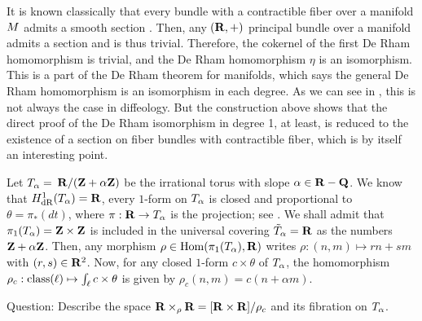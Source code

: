\begin{article}
  \label{The-first-De-Rham-homomorphism-for-manifolds}
  It is known classically that every bundle with a contractible fiber over a manifold $M$ admits a smooth section \cite{Die70c}.
  Then, any $({\mathbf R},+)$ principal bundle over a manifold admits a section and is thus trivial.
  Therefore,
  the cokernel of the first De Rham homomorphism is trivial,
  and the De Rham homomorphism $\eta$ is an isomorphism.
  This is a part of the De Rham theorem for manifolds,
  which says the general De Rham homomorphism is an isomorphism in each degree.
  As we can see in ,
  this is not always the case in diffeology.
  But the construction above  shows that the direct proof of the De Rham isomorphism in degree 1,
  at least,
  is reduced to the existence of a section on fiber bundles with contractible fiber,
  which is by itself an interesting point.
\end{article} %

%
%

\Exercises

\begin{exercise}
  \label{De-Rham-homomorphism-and-irrational-tori}
  Let ${T}_{\alpha} =$
  \linebreak
  ${\mathbf R}/({\mathbf Z}+\alpha{\mathbf Z})$ be the irrational torus with slope $\alpha \in {\mathbf R}-{\mathbf Q}$.
  We know that $H_\mathrm{dR}^1({T}_{\alpha}) = {\mathbf R}$,
  every $1$-form on ${T}_{\alpha}$ is closed and proportional to $\theta = \pi_*(dt)$,
  where $\pi: {\mathbf R} \to {T}_{\alpha}$ is the projection;
  see .
  We shall admit that $\pi_1({T}_{\alpha}) = {\mathbf Z}\times {\mathbf Z}$ is included in the universal covering $\tilde {T}_{\alpha} = {\mathbf R}$ as the numbers ${\mathbf Z}+\alpha {\mathbf Z}$.
  Then,
  any morphism $\rho \in \mathrm{Hom}(\pi_1({T}_{\alpha}),{\mathbf R})$ writes $\rho: (n,m) \mapsto r n + s m$ with $(r,s) \in {\mathbf R}^2$.
  Now,
  for any closed $1$-form $c \times \theta$ of ${T}_{\alpha}$,
  the homomorphism $\rho_c: \operatorname{class}(\ell) \mapsto \int_\ell c \times \theta$ is given by $\rho_c(n,m) = c(n +\alpha m)$.
  
  Question: Describe the space ${\mathbf R}\times_\rho{\mathbf R} = [{\mathbf R}\times {\mathbf R}]/\rho_c$ and its fibration on ${T}_{\alpha}$.
\end{exercise} %


